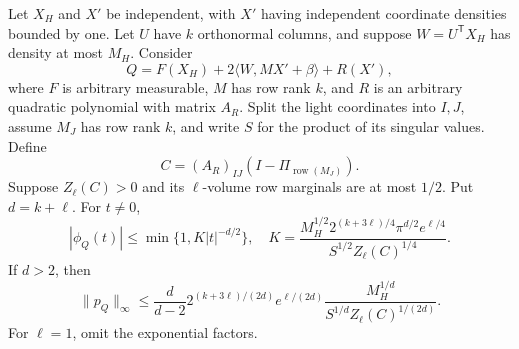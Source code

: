 \begin{theorem}
\label{thm:grouped-crossing}
Let \(X_H\) and \(X'\) be independent, with \(X'\) having
independent coordinate densities bounded by one.
Let \(U\) have \(k\) orthonormal columns, and suppose
\(W=U^{\mathsf T}X_H\) has density at most \(M_H\).
Consider
\[
 Q=F(X_H)+2\langle W,MX'+\beta\rangle+R(X'),
\]
where \(F\) is arbitrary measurable, \(M\) has row rank
\(k\), and \(R\) is an arbitrary quadratic polynomial
with matrix \(A_R\).
Split the light coordinates into \(I,J\), assume
\(M_J\) has row rank \(k\), and write \(S\) for the
product of its singular values.  Define
\[
 C=(A_R)_{IJ}(I-\Pi_{\operatorname{row}(M_J)}).
\]
Suppose \(Z_\ell(C)>0\) and its \(\ell\)-volume row
marginals are at most \(1/2\).  Put \(d=k+\ell\).
For \(t\ne0\),
\[
 |\phi_Q(t)|\leq\min\{1,K|t|^{-d/2}\},
 \quad
 K=\frac{M_H^{1/2}2^{(k+3\ell)/4}\pi^{d/2}e^{\ell/4}}
 {S^{1/2}Z_\ell(C)^{1/4}}.
\]
If \(d>2\), then
\begin{equation}
 \|p_Q\|_\infty\leq
 \frac d{d-2}
 2^{(k+3\ell)/(2d)}e^{\ell/(2d)}
 \frac{M_H^{1/d}}{S^{1/d}Z_\ell(C)^{1/(2d)}}.
 \label{eq:grouped-crossing-density}
\end{equation}
For \(\ell=1\), omit the exponential factors.
\end{theorem}

